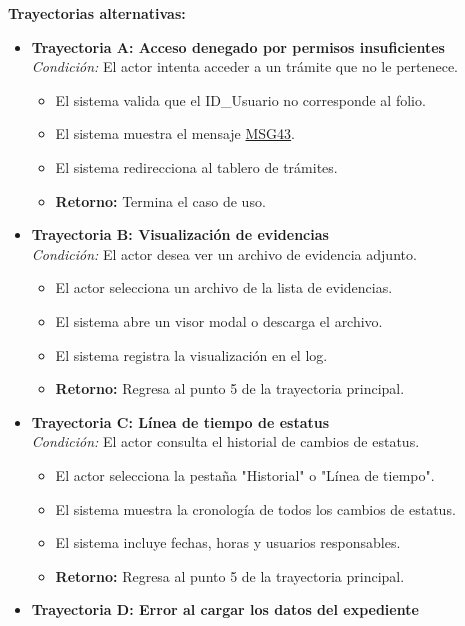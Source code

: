 \begin{appendices}
\textbf{Trayectorias alternativas:}
\begin{itemize}[leftmargin=*]
    \item \textbf{Trayectoria A: Acceso denegado por permisos insuficientes} \\
    \textit{Condición:} El actor intenta acceder a un trámite que no le pertenece.
    \begin{itemize}[nosep]
        \item[A-1:] El sistema valida que el ID\_Usuario no corresponde al folio.
        \item[A-2:] El sistema muestra el mensaje \hyperlink{msg:MSG43}{MSG43}.
        \item[A-3:] El sistema redirecciona al tablero de trámites.
        \item \textbf{Retorno:} Termina el caso de uso.
    \end{itemize}
    \item \textbf{Trayectoria B: Visualización de evidencias} \\
    \textit{Condición:} El actor desea ver un archivo de evidencia adjunto.
    \begin{itemize}[nosep]
        \item[B-1:] El actor selecciona un archivo de la lista de evidencias.
        \item[B-2:] El sistema abre un visor modal o descarga el archivo.
        \item[B-3:] El sistema registra la visualización en el log.
        \item \textbf{Retorno:} Regresa al punto 5 de la trayectoria principal.
    \end{itemize}
    \item \textbf{Trayectoria C: Línea de tiempo de estatus} \\
    \textit{Condición:} El actor consulta el historial de cambios de estatus.
    \begin{itemize}[nosep]
        \item[C-1:] El actor selecciona la pestaña "Historial" o "Línea de tiempo".
        \item[C-2:] El sistema muestra la cronología de todos los cambios de estatus.
        \item[C-3:] El sistema incluye fechas, horas y usuarios responsables.
        \item \textbf{Retorno:} Regresa al punto 5 de la trayectoria principal.
    \end{itemize}
    \item \textbf{Trayectoria D: Error al cargar los datos del expediente} \\

\end{itemize}
\end{appendices}
